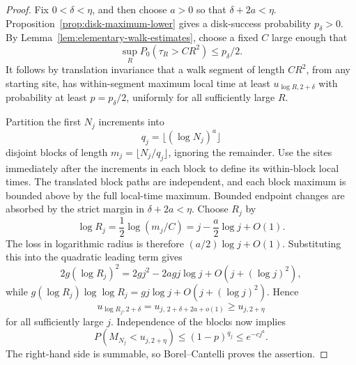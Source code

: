 \begin{proof}
Fix $0<\delta<\eta$, and then choose $a>0$ so that
$\delta+2a<\eta$.  Proposition~\ref{prop:disk-maximum-lower}
gives a disk-success probability $p_\delta>0$.  By
Lemma~\ref{lem:elementary-walk-estimates}, choose a fixed $C$
large enough that
\[
 \sup_R P_0(\tau_R>CR^2)\le p_\delta/2.
\]
It follows by translation invariance that a walk segment of length
$CR^2$, from any starting site, has within-segment maximum local
time at least $u_{\log R,2+\delta}$ with probability at least
$p=p_\delta/2$, uniformly for all sufficiently large $R$.

Partition the first $N_j$ increments into
\[
 q_j=\lfloor(\log N_j)^a\rfloor
\]
disjoint blocks of length $m_j=\lfloor N_j/q_j\rfloor$, ignoring
the remainder.  Use the sites immediately after the increments in
each block to define its within-block local times.  The translated
block paths are independent, and each block maximum is bounded
above by the full local-time maximum.  Bounded endpoint changes
are absorbed by the strict margin in $\delta+2a<\eta$.
Choose $R_j$ by
\[
 \log R_j=\frac12\log(m_j/C)
         =j-\frac a2\log j+O(1).
\]
The loss in logarithmic radius is therefore $(a/2)\log j+O(1)$.
Substituting this into the quadratic leading term gives
\[
 2g(\log R_j)^2
 =2gj^2-2agj\log j+O(j+(\log j)^2),
\]
while
$g(\log R_j)\log\log R_j=gj\log j+O(j+(\log j)^2)$.
Hence
\begin{equation}
 u_{\log R_j,2+\delta}
 =u_{j,\,2+\delta+2a+o(1)}
 \ge u_{j,2+\eta}
 \tag{78}\label{eq:deterministic-block-level}
\end{equation}
for all sufficiently large $j$.  Independence of the blocks now
implies
\begin{equation}
 P(M_{N_j}<u_{j,2+\eta})
 \le(1-p)^{q_j}\le e^{-cj^a}.
 \tag{79}\label{eq:deterministic-failure-summable}
\end{equation}
The right-hand side is summable, so Borel--Cantelli proves the
assertion.
\end{proof}
